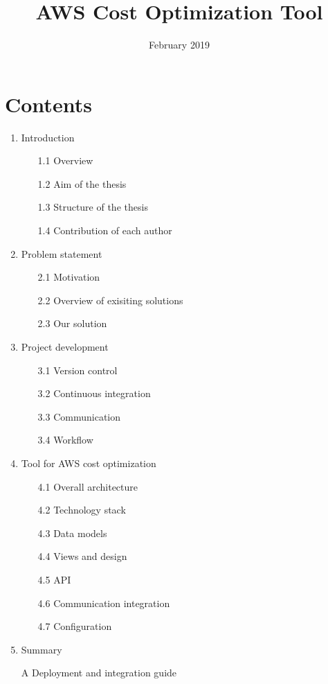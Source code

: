 \documentclass[licencjacka,en]{thesisclass}
\title{AWS Cost Optimization Tool}
\date{February 2019}
\begin{document}
    \maketitle

    \begin{abstract}
        
    \end{abstract}

    \chapter*{Contents}

    \begin{enumerate}
        \item Introduction
        \begin{enumerate}
            \item [1.1] Overview
            \item [1.2] Aim of the thesis
            \item [1.3] Structure of the thesis
            \item [1.4] Contribution of each author
        \end{enumerate}
        \item Problem statement
        \begin{enumerate}
            \item [2.1] Motivation
            \item [2.2] Overview of exisiting solutions
            \item [2.3] Our solution
        \end{enumerate}
        \item Project development
        \begin{enumerate}
            \item [3.1] Version control
            \item [3.2] Continuous integration
            \item [3.3] Communication
            \item [3.4] Workflow
        \end{enumerate}
        \item Tool for AWS cost optimization
        \begin{enumerate}
            \item [4.1] Overall architecture
            \item [4.2] Technology stack
            \item [4.3] Data models
            \item [4.4] Views and design
            \item [4.5] API
            \item [4.6] Communication integration
            \item [4.7] Configuration
        \end{enumerate}
        \item Summary
        \item [A] Deployment and integration guide
    \end{enumerate}
\end{document}
